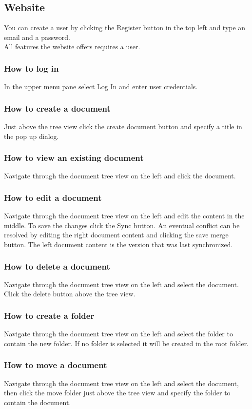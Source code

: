 \documentclass[a4paper,11pt,report]{report}
\begin{document}
\subsection{Website}
You can create a user by clicking the Register button in the top left and type an email and a password. \\
All features the website offers requires a user.
\subsubsection {How to log in}
In the upper menu pane select Log In and enter user credentials. 
\subsubsection {How to create a document}
Just above the tree view click the create document button and specify a title in the pop up dialog.
\subsubsection{How to view an existing document}
Navigate through the document tree view on the left and click the document.
\subsubsection {How to edit a document}
Navigate through the document tree view on the left and edit the content in the middle. To save the changes click the Sync button. An eventual conflict can be resolved by editing the right document content and clicking the save merge button. The left document content is the version that was last synchronized.
\subsubsection {How to delete a document}
Navigate through the document tree view on the left and select the document. Click the delete button above the tree view.
\subsubsection {How to create a folder}
Navigate through the document tree view on the left and select the folder to contain the new folder. If no folder is selected it will be created in the root folder.
\subsubsection {How to move a document}
Navigate through the document tree view on the left and select the document, then click the move folder just above the tree view and specify the folder to contain the document. 
\end{document}

